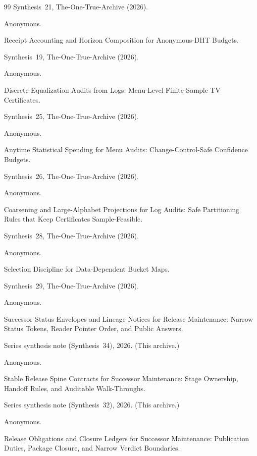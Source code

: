 \documentclass[11pt]{article}
\begin{document}
\begin{thebibliography}{99}
\newblock Synthesis~21, The-One-True-Archive (2026).

Anonymous.

\newblock Receipt Accounting and Horizon Composition for Anonymous-DHT Budgets.

\newblock Synthesis~19, The-One-True-Archive (2026).


Anonymous.

\newblock Discrete Equalization Audits from Logs: Menu-Level Finite-Sample TV Certificates.

\newblock Synthesis~25, The-One-True-Archive (2026).

Anonymous.

\newblock Anytime Statistical Spending for Menu Audits: Change-Control-Safe Confidence Budgets.

\newblock Synthesis~26, The-One-True-Archive (2026).

Anonymous.

\newblock Coarsening and Large-Alphabet Projections for Log Audits: Safe Partitioning Rules that Keep Certificates Sample-Feasible.

\newblock Synthesis~28, The-One-True-Archive (2026).

Anonymous.

\newblock Selection Discipline for Data-Dependent Bucket Maps.

\newblock Synthesis~29, The-One-True-Archive (2026).

Anonymous.

\newblock Successor Status Envelopes and Lineage Notices for Release Maintenance: Narrow Status Tokens, Reader Pointer Order, and Public Answers.

\newblock Series synthesis note (Synthesis~34), 2026. (This archive.)

Anonymous.

\newblock Stable Release Spine Contracts for Successor Maintenance: Stage Ownership, Handoff Rules, and Auditable Walk-Throughs.

\newblock Series synthesis note (Synthesis~32), 2026. (This archive.)

Anonymous.

\newblock Release Obligations and Closure Ledgers for Successor Maintenance: Publication Duties, Package Closure, and Narrow Verdict Boundaries.


\end{thebibliography}
\end{document}
